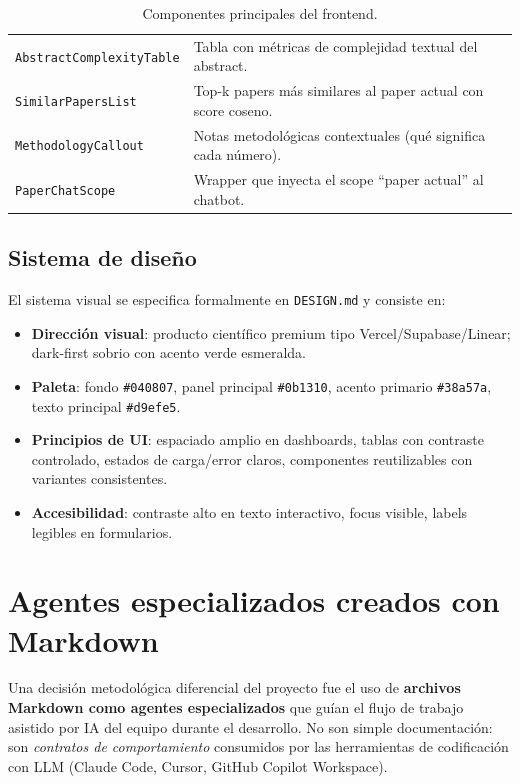 \documentclass[11pt,a4paper]{article}
\newcommand{\modulo}[1]{\texttt{\textcolor{accent}{#1}}}
\newcommand{\file}[1]{\texttt{\small #1}}
\begin{document}
\begin{table}[h]
\begin{tabularx}{\linewidth}{l X}
\modulo{AbstractComplexityTable} & Tabla con métricas de complejidad textual del abstract. \\
\modulo{SimilarPapersList} & Top-k papers más similares al paper actual con score coseno. \\
\modulo{MethodologyCallout} & Notas metodológicas contextuales (qué significa cada número). \\
\modulo{PaperChatScope} & Wrapper que inyecta el scope ``paper actual'' al chatbot. \\
\bottomrule
\end{tabularx}
\caption{Componentes principales del frontend.}
\end{table}

\subsection{Sistema de diseño}

El sistema visual se especifica formalmente en \file{DESIGN.md} y consiste en:

\begin{itemize}
\item \textbf{Dirección visual}: producto científico premium tipo Vercel/Supabase/Linear; dark-first sobrio con acento verde esmeralda.
\item \textbf{Paleta}: fondo \texttt{\#040807}, panel principal \texttt{\#0b1310}, acento primario \texttt{\#38a57a}, texto principal \texttt{\#d9efe5}.
\item \textbf{Principios de UI}: espaciado amplio en dashboards, tablas con contraste controlado, estados de carga/error claros, componentes reutilizables con variantes consistentes.
\item \textbf{Accesibilidad}: contraste alto en texto interactivo, focus visible, labels legibles en formularios.
\end{itemize}

\section{Agentes especializados creados con Markdown}\label{sec:md_agents}

Una decisión metodológica diferencial del proyecto fue el uso de \textbf{archivos Markdown como agentes especializados} que guían el flujo de trabajo asistido por IA del equipo durante el desarrollo. No son simple documentación: son \emph{contratos de comportamiento} consumidos por las herramientas de codificación con LLM (Claude Code, Cursor, GitHub Copilot Workspace).
\end{document}
